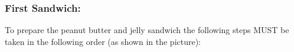 \documentclass[12pt]{report}
\begin{document}
\begin{appendices}
\begin{figure}%
    \centering
    \qquad
    \label{fig:recipse-instruction}%
\end{figure}


\subsubsection{First Sandwich:}
To prepare the peanut butter and jelly sandwich the following steps MUST be
taken in the following order (as shown in the picture):


\end{appendices}
\end{document}
